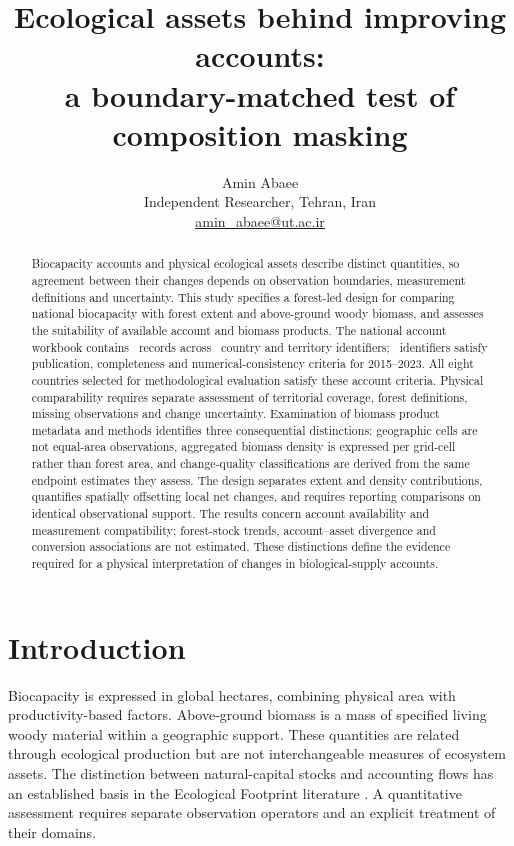 \documentclass[11pt,a4paper]{article}
\title{Ecological assets behind improving accounts:\\a boundary-matched test of composition masking}
\author{Amin Abaee\\\small Independent Researcher, Tehran, Iran\\\small\href{mailto:amin_abaee@ut.ac.ir}{amin\_abaee@ut.ac.ir}}
\date{}
\begin{document}
\maketitle
\begin{abstract}
Biocapacity accounts and physical ecological assets describe distinct quantities, so agreement between their changes depends on observation boundaries, measurement definitions and uncertainty. This study specifies a forest-led design for comparing national biocapacity with forest extent and above-ground woody biomass, and assesses the suitability of available account and biomass products. The national account workbook contains \NationalRows\ records across \CountryIDs\ country and territory identifiers; \AccountPass\ identifiers satisfy publication, completeness and numerical-consistency criteria for 2015--2023. All eight countries selected for methodological evaluation satisfy these account criteria. Physical comparability requires separate assessment of territorial coverage, forest definitions, missing observations and change uncertainty. Examination of biomass product metadata and methods identifies three consequential distinctions: geographic cells are not equal-area observations, aggregated biomass density is expressed per grid-cell rather than forest area, and change-quality classifications are derived from the same endpoint estimates they assess. The design separates extent and density contributions, quantifies spatially offsetting local net changes, and requires reporting comparisons on identical observational support. The results concern account availability and measurement compatibility; forest-stock trends, account--asset divergence and conversion associations are not estimated. These distinctions define the evidence required for a physical interpretation of changes in biological-supply accounts.
\end{abstract}

\section{Introduction}
Biocapacity is expressed in global hectares, combining physical area with productivity-based factors. Above-ground biomass is a mass of specified living woody material within a geographic support. These quantities are related through ecological production but are not interchangeable measures of ecosystem assets. The distinction between natural-capital stocks and accounting flows has an established basis in the Ecological Footprint literature \citep{Mancini2017}. A quantitative assessment requires separate observation operators and an explicit treatment of their domains.
\end{document}
